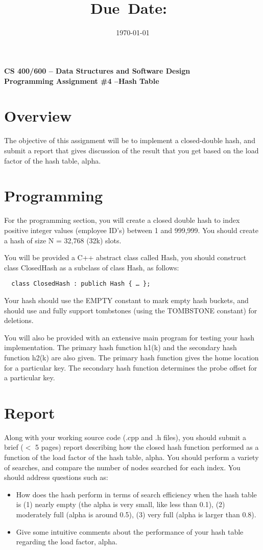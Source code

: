 \documentclass{article}
\title{\textmd{\textbf{\hmwkClass\\\
      \hmwkTitle}}\\\normalsize\small{Due\ Date:\
    \hmwkDueDate}\\}
\date{\today}
\author{\textsc{\hmwkAuthorName}}
\begin{document}
\begin{center}
\textbf{{\Large CS 400/600 – Data Structures and Software Design} \\
{\large Programming Assignment \#4 –Hash Table}}
\end{center}

\section*{Overview}
The objective of this assignment will be to implement a closed-double
hash, and submit a report that gives  discussion of the result that
you get based on the load factor of the hash table, alpha.  

\section*{Programming}
For the programming section, you will create a closed double hash to
index positive integer values (employee ID’s) between 1 and 999,999.
You should create a hash of size N = 32,768 (32k) slots. 

You will be provided a C++ abstract class called Hash, you should
construct class ClosedHash as a subclass of class Hash, as follows:

\begin{verbatim}
  class ClosedHash : publich Hash { … }; 
\end{verbatim}

Your hash should use the EMPTY constant to mark empty hash buckets,
and should use and fully support tombstones (using the TOMBSTONE
constant) for deletions. 

You will also be provided with an extensive main program for testing
your hash implementation. The primary hash function h1(k) and the
secondary hash function h2(k) are also given. The primary hash
function gives the home location for a particular key. The secondary
hash function determines the probe offset for a particular key. 

\section*{Report}
Along with your working source code (.cpp and .h files), you should
submit a brief ($<$ 5 pages) report describing how the closed hash
function performed as a function of the load factor of the hash table,
alpha. You should perform a variety of searches, and compare the
number of nodes searched for each index.  You should address questions
such as: 
\begin{itemize}
\item How does the hash perform in terms of search efficiency when the hash
  table is (1) nearly empty (the alpha is very small, like less than
  0.1),  (2) moderately full (alpha is around 0.5),  (3) very full
  (alpha is larger than 0.8). 
\item Give some intuitive comments about the performance of your hash table
  regarding the load factor, alpha.  
\end{itemize}
\end{document}
